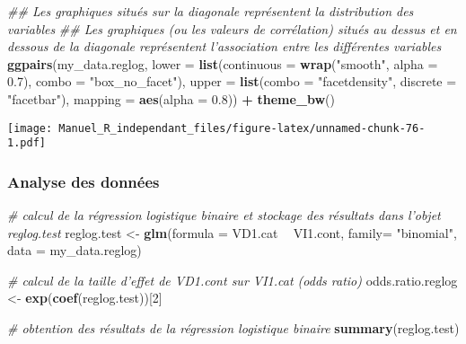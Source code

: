 \documentclass[
]{book}
\newenvironment{Shaded}{\begin{snugshade}}{\end{snugshade}}
\newcommand{\CommentTok}[1]{\textcolor[rgb]{0.56,0.35,0.01}{\textit{#1}}}
\newcommand{\DataTypeTok}[1]{\textcolor[rgb]{0.13,0.29,0.53}{#1}}
\newcommand{\DecValTok}[1]{\textcolor[rgb]{0.00,0.00,0.81}{#1}}
\newcommand{\FloatTok}[1]{\textcolor[rgb]{0.00,0.00,0.81}{#1}}
\newcommand{\KeywordTok}[1]{\textcolor[rgb]{0.13,0.29,0.53}{\textbf{#1}}}
\newcommand{\NormalTok}[1]{#1}
\newcommand{\OperatorTok}[1]{\textcolor[rgb]{0.81,0.36,0.00}{\textbf{#1}}}
\newcommand{\StringTok}[1]{\textcolor[rgb]{0.31,0.60,0.02}{#1}}
\begin{document}
\begin{Shaded}
\begin{Highlighting}[]
\CommentTok{## Les graphiques situés sur la diagonale représentent la distribution des variables}
\CommentTok{## Les graphiques (ou les valeurs de corrélation) situés au dessus et en dessous de la diagonale représentent l'association entre les différentes variables}
\KeywordTok{ggpairs}\NormalTok{(my_data.reglog,}
        \DataTypeTok{lower =} \KeywordTok{list}\NormalTok{(}\DataTypeTok{continuous =} \KeywordTok{wrap}\NormalTok{(}\StringTok{"smooth"}\NormalTok{, }\DataTypeTok{alpha =} \FloatTok{0.7}\NormalTok{), }\DataTypeTok{combo =} \StringTok{"box_no_facet"}\NormalTok{),}
        \DataTypeTok{upper =} \KeywordTok{list}\NormalTok{(}\DataTypeTok{combo =} \StringTok{"facetdensity"}\NormalTok{, }\DataTypeTok{discrete =} \StringTok{"facetbar"}\NormalTok{), }
        \DataTypeTok{mapping =} \KeywordTok{aes}\NormalTok{(}\DataTypeTok{alpha =} \FloatTok{0.8}\NormalTok{)) }\OperatorTok{+}\StringTok{ }\KeywordTok{theme_bw}\NormalTok{()}
\end{Highlighting}
\end{Shaded}

\texttt{[image: Manuel\_R\_independant\_files/figure-latex/unnamed-chunk-76-1.pdf]}

\hypertarget{analyse-des-donnuxe9es-8}{%
\subsubsection{Analyse des données}\label{analyse-des-donnuxe9es-8}}

\begin{Shaded}
\begin{Highlighting}[]
\CommentTok{# calcul de la régression logistique binaire et stockage des résultats dans l’objet reglog.test}
\NormalTok{reglog.test <-}\StringTok{ }\KeywordTok{glm}\NormalTok{(}\DataTypeTok{formula =}\NormalTok{ VD1.cat }\OperatorTok{~}\StringTok{ }\NormalTok{VI1.cont, }
                   \DataTypeTok{family=} \StringTok{"binomial"}\NormalTok{, }
                   \DataTypeTok{data =}\NormalTok{ my_data.reglog)}

\CommentTok{# calcul de la taille d'effet de VD1.cont sur VI1.cat (odds ratio)}
\NormalTok{odds.ratio.reglog <-}\StringTok{ }\KeywordTok{exp}\NormalTok{(}\KeywordTok{coef}\NormalTok{(reglog.test))[}\DecValTok{2}\NormalTok{]}

\CommentTok{# obtention des résultats de la régression logistique binaire}
\KeywordTok{summary}\NormalTok{(reglog.test)}
\end{Highlighting}
\end{Shaded}
\end{document}
